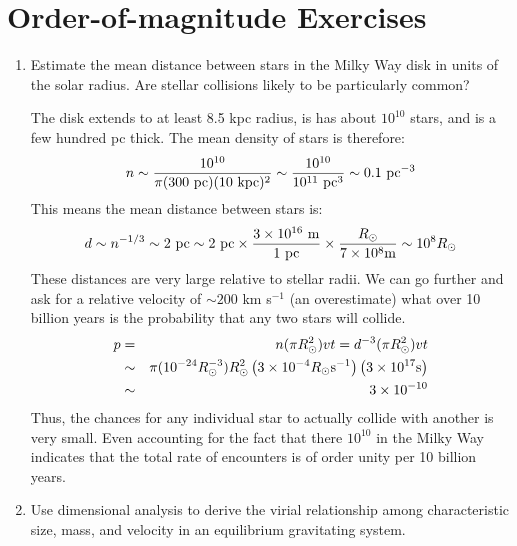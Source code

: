 \section{Order-of-magnitude Exercises}

\begin{enumerate} 
\item Estimate the mean distance between stars in the Milky Way disk
  in units of the solar radius. Are stellar collisions likely to be
  particularly common?

\begin{answer}
The disk extends to at least 8.5 kpc radius, is has about $10^{10}$
stars, and is a few hundred pc thick. The mean density of stars is
therefore:
\begin{equation}
n \sim \frac{10^{10}}{\pi (300 {\rm ~pc}) (10 {\rm ~kpc})^2} \sim
\frac{10^{10}}{10^{11} {\rm ~pc}^3} \sim  0.1 {\rm ~pc}^{-3} 
\end{equation}
This means the mean distance between stars is:
\begin{equation}
d \sim n^{-1/3} \sim 2 {\rm ~pc} \sim 2 {\rm ~pc} \times \frac{3 \times
  10^{16} {\rm ~m}}{1 {\rm ~pc}} \times \frac{R_\odot}{7 \times 10^8 {\rm
    m}}
\sim 10^8 R_\odot
\end{equation}
These distances are very large relative to stellar radii. We can go
further and ask for a relative velocity of $\sim 200$ km s$^{-1}$ (an
overestimate) what over 10 billion years is the probability that any
two stars will collide.
\begin{eqnarray}
  p &=& n (\pi R_\odot^2) v t = d^{-3} (\pi R_\odot^2) v t \cr
  &\sim& \pi (10^{-24} R_\odot^{-3}) R_\odot^2 \left(3 \times
  10^{-4} R_\odot {\rm s}^{-1}\right) \left(3 \times 10^{17} {\rm
    s}\right) \cr
  &\sim& 3 \times 10^{-10} 
\end{eqnarray}
Thus, the chances for any individual star to actually collide with
another is very small. Even accounting for the fact that there
$10^{10}$ in the Milky Way indicates that the total rate of encounters
is of order unity per 10 billion years.
\end{answer}
\item Use dimensional analysis to derive the virial relationship
among characteristic size, mass, and velocity in an equilibrium
gravitating system.


\end{enumerate}

